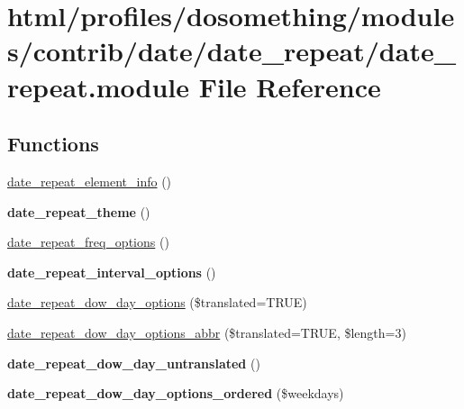 \hypertarget{date__repeat_8module}{
\section{html/profiles/dosomething/modules/contrib/date/date\_\-repeat/date\_\-repeat.module File Reference}
\label{date__repeat_8module}
}
\subsection*{Functions}
\begin{DoxyCompactItemize}
\item 
\hyperlink{date__repeat_8module_ac3359bf013cf5935d9e568b487ac998d}{date\_\-repeat\_\-element\_\-info} ()
\item 
\hypertarget{date__repeat_8module_a7591faeb7a69bda809ba7f13a80e0d3b}{
{\bfseries date\_\-repeat\_\-theme} ()}
\label{date__repeat_8module_a7591faeb7a69bda809ba7f13a80e0d3b}

\item 
\hyperlink{date__repeat_8module_af608a6efa0eeb6869465857d6d88b2d6}{date\_\-repeat\_\-freq\_\-options} ()
\item 
\hypertarget{date__repeat_8module_acacc593ff82cfa047b4acedcbdf31af9}{
{\bfseries date\_\-repeat\_\-interval\_\-options} ()}
\label{date__repeat_8module_acacc593ff82cfa047b4acedcbdf31af9}

\item 
\hyperlink{date__repeat_8module_a938156c8ac8c3b23be30ae1b539bdf65}{date\_\-repeat\_\-dow\_\-day\_\-options} (\$translated=TRUE)
\item 
\hyperlink{date__repeat_8module_a400fbbb589ca7ebe680239e5332ab5f1}{date\_\-repeat\_\-dow\_\-day\_\-options\_\-abbr} (\$translated=TRUE, \$length=3)
\item 
\hypertarget{date__repeat_8module_a57b91e314d3c9d80c4bf884b916d34b6}{
{\bfseries date\_\-repeat\_\-dow\_\-day\_\-untranslated} ()}
\label{date__repeat_8module_a57b91e314d3c9d80c4bf884b916d34b6}

\item 
\hypertarget{date__repeat_8module_a067a263131e0ae6616a243f0b40a2a2e}{
{\bfseries date\_\-repeat\_\-dow\_\-day\_\-options\_\-ordered} (\$weekdays)}
\label{date__repeat_8module_a067a263131e0ae6616a243f0b40a2a2e}


\end{DoxyCompactItemize}
